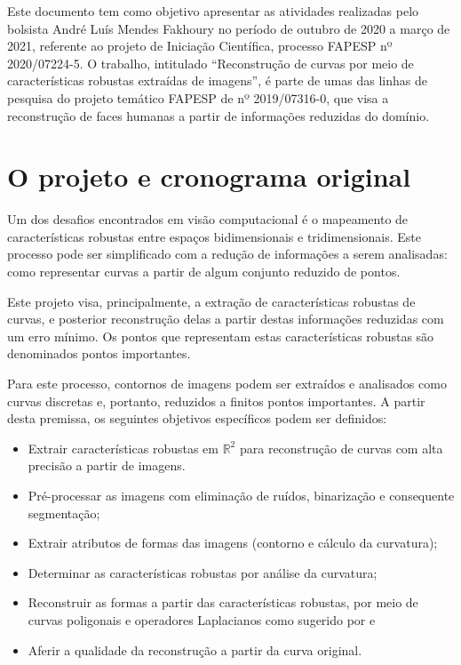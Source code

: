 Este documento tem como objetivo apresentar as atividades realizadas pelo bolsista André Luís Mendes Fakhoury no período de outubro de 2020 a março de 2021, referente ao projeto de Iniciação Científica, processo FAPESP nº 2020/07224-5. O trabalho, intitulado ``Reconstrução de curvas por meio de características robustas extraídas de imagens'', é parte de umas das linhas de pesquisa do projeto temático FAPESP de nº 2019/07316-0, que visa a reconstrução de faces humanas a partir de informações reduzidas do domínio.


\section{O projeto e cronograma original}

Um dos desafios encontrados em visão computacional é o mapeamento de características robustas entre espaços bidimensionais e tridimensionais. Este processo pode ser simplificado com a redução de informações a serem analisadas: como representar curvas a partir de algum conjunto reduzido de pontos.

Este projeto visa, principalmente, a extração de características robustas de curvas, e posterior reconstrução delas a partir destas informações reduzidas com um erro mínimo. Os pontos que representam estas características robustas são denominados pontos importantes.

Para este processo, contornos de imagens podem ser extraídos e analisados como curvas discretas e, portanto, reduzidos a finitos pontos importantes. A partir desta premissa, os seguintes objetivos específicos podem ser definidos:

\begin{itemize}[noitemsep]
	\item Extrair características robustas em $\mathbb{R}^2$ para reconstrução de curvas com alta precisão a partir de imagens. 
	\item Pré-processar as imagens com eliminação de ruídos, binarização e consequente segmentação;
	\item Extrair atributos de formas das imagens (contorno e cálculo da curvatura);
	\item Determinar as características robustas por análise da curvatura;
	\item Reconstruir as formas a partir das características robustas, por meio de curvas poligonais e operadores Laplacianos como sugerido por  e 
	\item Aferir a qualidade da reconstrução a partir da curva original.
\end{itemize}

